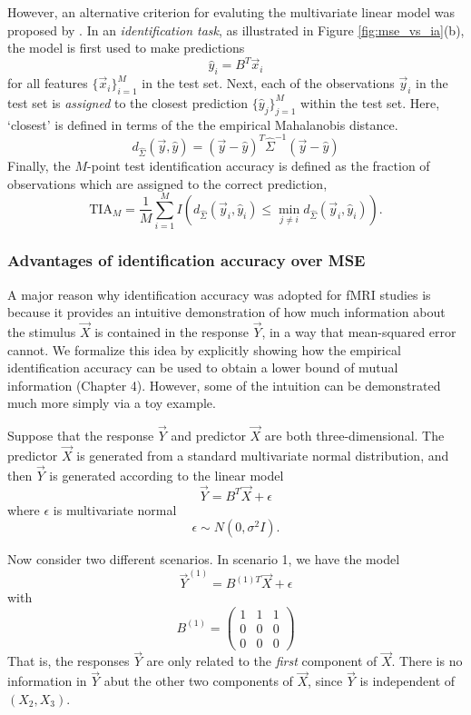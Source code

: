 However, an alternative criterion for evaluting the multivariate
linear model was proposed by \cite{Kay2008a}.  In an
\emph{identification task}, as illustrated in Figure
\ref{fig:mse_vs_ia}(b), the model is first used to make predictions
\[
\hat{y}_i = B^T \vec{x}_i
\]
for all features $\{\vec{x}_i\}_{i=1}^M$ in the test set. Next, each of the
observations $\vec{y}_i$ in the test set is \emph{assigned} to the
closest prediction $\{\hat{y}_j\}_{j=1}^M$ within the test set.
Here, `closest' is defined in terms of the 
the empirical Mahalanobis distance.
\[
d_{\hat{\Sigma}}(\vec{y}, \hat{y}) = (\vec{y} - \hat{y})^T \hat{\Sigma}^{-1} (\vec{y}-\hat{y})
\]
Finally, the $M$-point test identification accuracy is defined as the fraction
of observations which are assigned to the correct prediction,
\[
\text{TIA}_M = \frac{1}{M}\sum_{i=1}^M I(d_{\hat{\Sigma}}(\vec{y}_i, \hat{y}_i) \leq \min_{j \neq i} d_{\hat{\Sigma}}(\vec{y}_i, \hat{y}_i)).
\]

\subsubsection{Advantages of identification accuracy over MSE}

A major reason why identification accuracy was adopted for fMRI
studies is because it provides an intuitive demonstration of how much
information about the stimulus $\vec{X}$ is contained in the response
$\vec{Y}$, in a way that mean-squared error cannot.  We formalize this
idea by explicitly showing how the empirical identification accuracy
can be used to obtain a lower bound of mutual information (Chapter 4).
However, some of the intuition can be demonstrated much more simply
via a toy example.

Suppose that the response $\vec{Y}$ and predictor $\vec{X}$ are both
three-dimensional.  The predictor $\vec{X}$ is generated from a standard
multivariate normal distribution, and then $\vec{Y}$ is generated
according to the linear model
\[
\vec{Y} = B^T \vec{X} + \epsilon
\]
where $\epsilon$ is multivariate normal
\[
\epsilon \sim N(0, \sigma^2 I).
\]

Now consider two different scenarios.  In scenario 1, we have
the model 
\[
\vec{Y}^{(1)} = B^{(1)T} \vec{X} + \epsilon
\]
with
\[
B^{(1)} = \begin{pmatrix}
1 & 1 & 1\\
0 & 0 & 0\\
0 & 0 & 0
\end{pmatrix}
\]
That is, the responses $\vec{Y}$ are only related to the \emph{first}
component of $\vec{X}$.  There is no information in $\vec{Y}$ abut the
other two components of $\vec{X}$, since $\vec{Y}$ is independent of
$(X_2, X_3)$.

